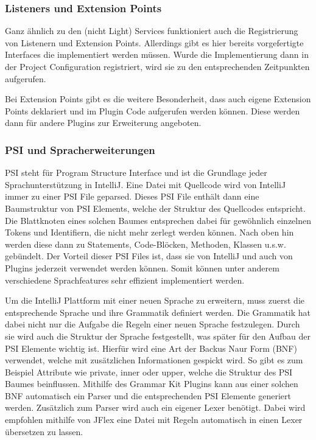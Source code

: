 \subsubsection{Listeners und Extension Points}

  Ganz ähnlich zu den (nicht Light) Services funktioniert auch die Registrierung von Listenern
  und Extension Points. Allerdings gibt es hier bereits vorgefertigte Interfaces die implementiert
  werden müssen. Wurde die Implementierung dann in der Project Configuration registriert, wird
  sie zu den entsprechenden Zeitpunkten aufgerufen.
  
  Bei Extension Points gibt es die weitere Besonderheit, dass auch eigene Extension Points deklariert
  und im Plugin Code aufgerufen werden können. Diese werden dann für andere Plugins zur Erweiterung
  angeboten.

\subsubsection{PSI und Spracherweiterungen}

  PSI steht für Program Structure Interface und ist die Grundlage jeder Sprachunterstützung in
  IntelliJ. Eine Datei mit Quellcode wird von IntelliJ immer zu einer PSI File geparsed. 
  Dieses PSI File enthält dann eine Baumstruktur von PSI Elements, welche der
  Struktur des Quellcodes entspricht. Die Blattknoten eines solchen Baumes entsprechen dabei
  für gewöhnlich einzelnen Tokens und Identifiern, die nicht mehr zerlegt werden können.
  Nach oben hin werden diese dann zu Statements, Code-Blöcken, Methoden, Klassen u.s.w. gebündelt.
  Der Vorteil dieser PSI Files ist, dass sie von IntelliJ und auch von Plugins jederzeit
  verwendet werden können. Somit können unter anderem verschiedene Sprachfeatures sehr
  effizient implementiert werden.

  Um die IntelliJ Plattform mit einer neuen Sprache zu erweitern, muss zuerst die entsprechende
  Sprache und ihre Grammatik definiert werden. Die Grammatik hat dabei nicht nur die Aufgabe die 
  Regeln einer neuen Sprache festzulegen. Durch sie wird auch die Struktur der Sprache festgestellt,
  was später für den Aufbau der PSI Elemente wichtig ist. Hierfür wird eine Art der Backus Naur Form (BNF) 
  verwendet, welche mit zusätzlichen Informationen gespickt wird. So gibt es zum Beispiel Attribute
  wie private, inner oder upper, welche die Struktur des PSI Baumes beinflussen. Mithilfe des Grammar Kit Plugins
  kann aus einer solchen BNF automatisch ein Parser und die entsprechenden PSI Elemente generiert werden. 
  Zusätzlich zum Parser wird auch ein eigener Lexer benötigt. Dabei wird empfohlen mithilfe von JFlex
  eine Datei mit Regeln automatisch in einen Lexer übersetzen zu lassen.

